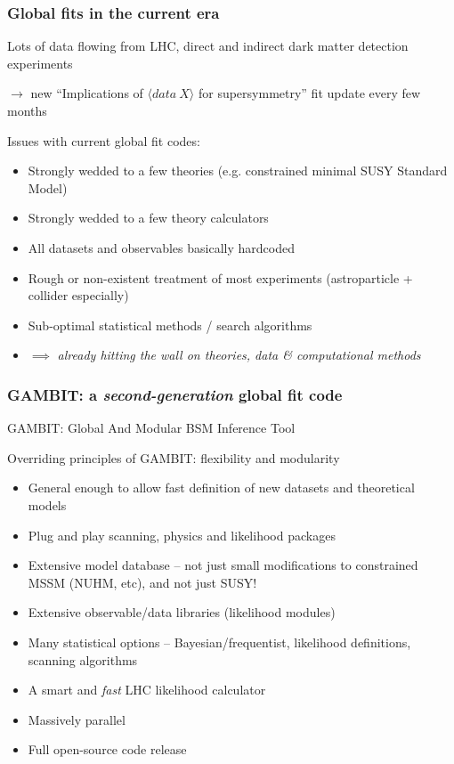 \documentclass[xcolor=dvipsnames]{beamer}
\begin{document}
\begin{frame}
\frametitle{Global fits in the current era}

Lots of data flowing from LHC, direct and indirect dark matter detection experiments

$\rightarrow$ new ``Implications of $\langle data\ X\rangle$ for supersymmetry'' fit update every few months\vspace{5mm}

Issues with current global fit codes:
\begin{itemize}
\item Strongly wedded to a few theories (e.g. constrained minimal SUSY Standard Model)
\item Strongly wedded to a few theory calculators
\item All datasets and observables basically hardcoded
\item Rough or non-existent treatment of most experiments (astroparticle + collider especially)
\item Sub-optimal statistical methods / search algorithms
\item $\implies$ \textit{already hitting the wall on theories, data \& computational methods}
\end{itemize}

\end{frame}



\begin{frame}
\frametitle{\textbf{GAMBIT}: a \textit{second-generation} global fit code}

GAMBIT: \alert{G}lobal \alert{A}nd \alert{M}odular \alert{B}SM \alert{I}nference \alert{T}ool
\vspace{5mm}

Overriding principles of GAMBIT: flexibility and modularity
\begin{itemize}
\item General enough to allow fast definition of new datasets and theoretical models
\item Plug and play scanning, physics and likelihood packages
\item Extensive model database -- not just small modifications to constrained MSSM (NUHM, etc), and not just SUSY!
\item Extensive observable/data libraries (likelihood modules)
\item Many statistical options -- Bayesian/frequentist, likelihood definitions, scanning algorithms
\item A smart and \textit{fast} LHC likelihood calculator
\item Massively parallel
\item Full open-source code release
\end{itemize}

\end{frame}
\end{document}
